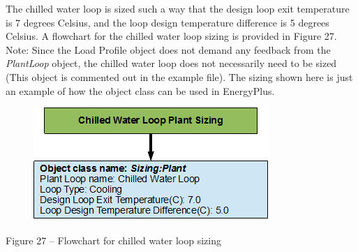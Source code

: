 The chilled water loop is sized such a way that the design loop exit temperature is 7 degrees Celsius, and the loop design temperature difference is 5 degrees Celsius. A flowchart for the chilled water loop sizing is provided in Figure 27. Note: Since the Load Profile object does not demand any feedback from the \emph{PlantLoop} object, the chilled water loop does not necessarily need to be sized (This object is commented out in the example file). The sizing shown here is just an example of how the object class can be used in EnergyPlus.

\begin{figure}[htbp]
\centering
\includegraphics{media/image027.png}
\caption{}
\end{figure}

Figure 27 -- Flowchart for chilled water loop sizing
